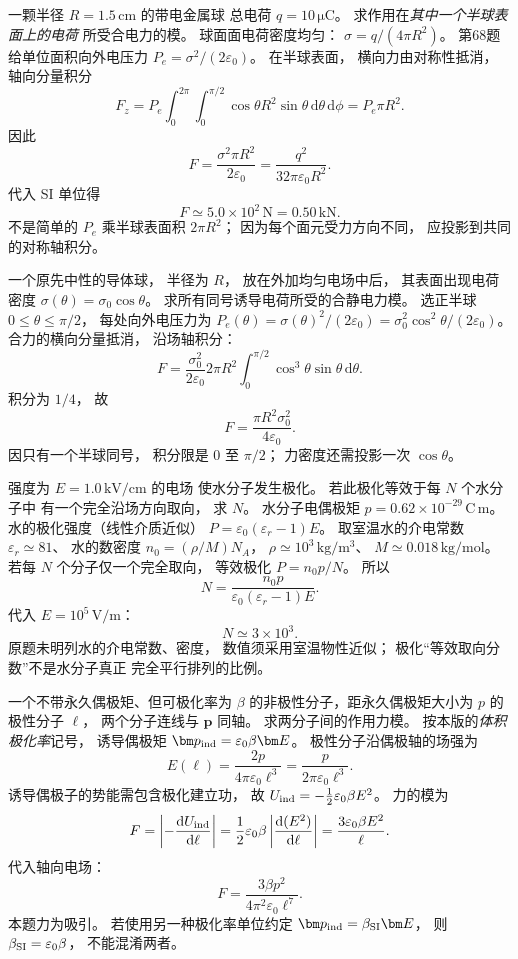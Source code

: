一颗半径 $R=1.5\,\mathrm{cm}$ 的带电金属球
总电荷 $q=10\,\mathrm{\mu C}$。
求作用在\emph{其中一个半球表面上的电荷}
所受合电力的模。
\exsolution
球面面电荷密度均匀：
$\sigma=q/(4\pi R^2)$。
第68题给单位面积向外电压力
$P_e=\sigma^2/(2\varepsilon_0)$。
在半球表面，
横向力由对称性抵消，
轴向分量积分
\[
F_z=P_e
\int_0^{2\pi}\!\!\int_0^{\pi/2}
\cos\theta R^2\sin\theta\,\mathrm d\theta\,\mathrm d\phi
=P_e\pi R^2.
\]
因此
\[
\boxed{F=\frac{\sigma^2\pi R^2}{2\varepsilon_0}
=\frac{q^2}{32\pi\varepsilon_0R^2}}.
\]
代入 SI 单位得
\[
\boxed{F\simeq5.0\times10^2\,\mathrm N=0.50\,\mathrm{kN}}.
\]
\excheck 不是简单的 $P_e$ 乘半球表面积 $2\pi R^2$；
因为每个面元受力方向不同，
应投影到共同的对称轴积分。

一个原先中性的导体球，
半径为 $R$，
放在外加均匀电场中后，
其表面出现电荷密度
$\sigma(\theta)=\sigma_0\cos\theta$。
求所有同号诱导电荷所受的合静电力模。
\exsolution
选正半球
$0\le\theta\le\pi/2$，
每处向外电压力为
$P_e(\theta)=\sigma(\theta)^2/(2\varepsilon_0)
=\sigma_0^2\cos^2\theta/(2\varepsilon_0)$。
合力的横向分量抵消，
沿场轴积分：
\[
F=\frac{\sigma_0^2}{2\varepsilon_0}
2\pi R^2\int_0^{\pi/2}
\cos^3\theta\sin\theta\,\mathrm d\theta.
\]
积分为 $1/4$，
故
\[
\boxed{F=\frac{\pi R^2\sigma_0^2}{4\varepsilon_0}}.
\]
\excheck 因只有一个半球同号，
积分限是 $0$ 至 $\pi/2$；
力密度还需投影一次 $\cos\theta$。

强度为
$E=1.0\,\mathrm{kV/cm}$ 的电场
使水分子发生极化。
若此极化等效于每 $N$ 个水分子中
有一个完全沿场方向取向，
求 $N$。
水分子电偶极矩
$p=0.62\times10^{-29}\,\mathrm{C\,m}$。
\exsolution
水的极化强度（线性介质近似）
$P=\varepsilon_0(\varepsilon_r-1)E$。
取室温水的介电常数
$\varepsilon_r\simeq81$、
水的数密度
$n_0=(\rho/M)N_A$，
$\rho\simeq10^3\,\mathrm{kg/m^3}$、
$M\simeq0.018\,\mathrm{kg/mol}$。
若每 $N$ 个分子仅一个完全取向，
等效极化
$P=n_0p/N$。
所以
\[
\boxed{N=\frac{n_0p}
{\varepsilon_0(\varepsilon_r-1)E}}.
\]
代入 $E=10^5\,\mathrm{V/m}$：
\[
\boxed{N\simeq3\times10^3}.
\]
\excheck 原题未明列水的介电常数、密度，
数值须采用室温物性近似；
极化“等效取向分数”不是水分子真正
完全平行排列的比例。

一个不带永久偶极矩、但可极化率为 $\beta$
的非极性分子，距永久偶极矩大小为 $p$
的极性分子 $\ell$，
两个分子连线与 $\bm p$ 同轴。
求两分子间的作用力模。
\exsolution
按本版的\emph{体积极化率}记号，
诱导偶极矩
$\bm p_{\rm ind}=\varepsilon_0\beta\bm E$。
极性分子沿偶极轴的场强为
\[
E(\ell)=\frac{2p}{4\pi\varepsilon_0\ell^3}
=\frac{p}{2\pi\varepsilon_0\ell^3}.
\]
诱导偶极子的势能需包含极化建立功，
故
$U_{\rm ind}=-\frac12\varepsilon_0\beta E^2$。
力的模为
\[
F=\left|-\frac{\mathrm dU_{\rm ind}}{\mathrm d\ell}\right|
=\frac12\varepsilon_0\beta
\left|\frac{\mathrm d(E^2)}{\mathrm d\ell}\right|
=\frac{3\varepsilon_0\beta E^2}{\ell}.
\]
代入轴向电场：
\[
\boxed{F=\frac{3\beta p^2}
{4\pi^2\varepsilon_0\ell^7}}.
\]
\excheck 本题力为吸引。
若使用另一种极化率单位约定
$\bm p_{\rm ind}=\beta_{\rm SI}\bm E$，
则 $\beta_{\rm SI}=\varepsilon_0\beta$，
不能混淆两者。

